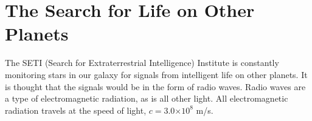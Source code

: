 \documentclass[10pt]{article}%
\providecommand{\e}[1]{\ensuremath{\times 10^{#1}}} %
\begin{document}

%


\section{The Search for Life on Other Planets}
The SETI (Search for Extraterrestrial Intelligence) Institute is constantly monitoring stars in our galaxy for signals from intelligent life on other planets.  
It is thought that the signals would be in the form of radio waves.  
Radio waves are a type of electromagnetic radiation, as is all other light.  
All electromagnetic radiation travels at the speed of light, $c=3.0 \e{8}$ m/s. 
\end{document}
